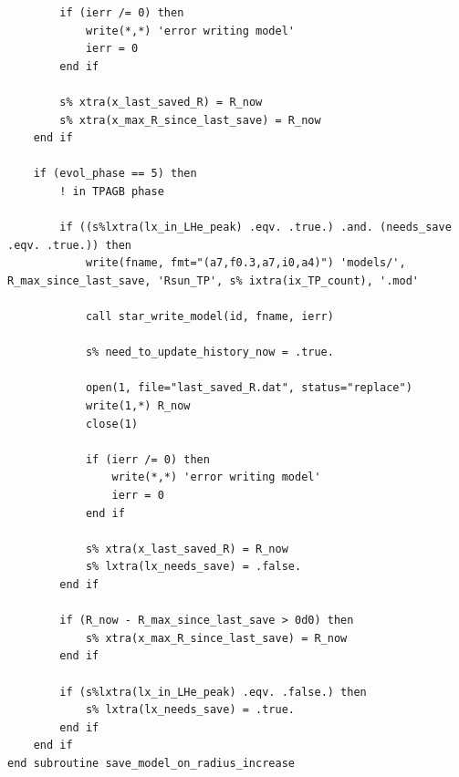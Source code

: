 \documentclass[a4paper,10pt]{article}
\begin{document}
\begin{verbatim}
        if (ierr /= 0) then
            write(*,*) 'error writing model'
            ierr = 0
        end if

        s% xtra(x_last_saved_R) = R_now
        s% xtra(x_max_R_since_last_save) = R_now
    end if

    if (evol_phase == 5) then
        ! in TPAGB phase

        if ((s%lxtra(lx_in_LHe_peak) .eqv. .true.) .and. (needs_save .eqv. .true.)) then
            write(fname, fmt="(a7,f0.3,a7,i0,a4)") 'models/', R_max_since_last_save, 'Rsun_TP', s% ixtra(ix_TP_count), '.mod'

            call star_write_model(id, fname, ierr)

            s% need_to_update_history_now = .true.

            open(1, file="last_saved_R.dat", status="replace")
            write(1,*) R_now
            close(1)

            if (ierr /= 0) then
                write(*,*) 'error writing model'
                ierr = 0
            end if

            s% xtra(x_last_saved_R) = R_now
            s% lxtra(lx_needs_save) = .false.
        end if

        if (R_now - R_max_since_last_save > 0d0) then
            s% xtra(x_max_R_since_last_save) = R_now
        end if

        if (s%lxtra(lx_in_LHe_peak) .eqv. .false.) then
            s% lxtra(lx_needs_save) = .true.
        end if
    end if
end subroutine save_model_on_radius_increase
\end{verbatim}
\end{document}
